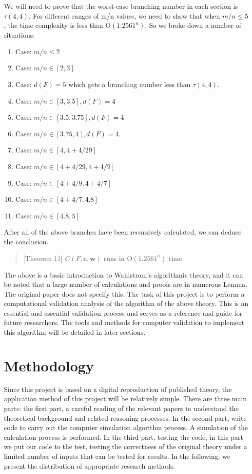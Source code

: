 \documentclass{sigchi}
\begin{document}
We will need to prove that the worst-case branching number in each section is $\tau(4,4)$. For different ranges of m/n values, we need to show that when $m/n\leqslant5$, the time complexity is less than $\mathrm{O}\left(1.2561^{n}\right)$. So we broke down a number of situations.
\begin{enumerate}
	\item Case: $m / n \leqslant2$
	\item Case: $m / n \in[2,3]$
	\item Case: $d(F)=5$ which gets a branching number less than $\tau(4,4)$.
	\item Case: $m / n \in[3,3.5], d(F)=4$
	\item Case: $m / n \in[3.5,3.75], d(F)=4$
	\item Case: $ m / n \in[3.75,4], d(F)=4 .$ 
	\item Case:  $m / n \in[4,4+4 / 29]$
	\item Case: $m / n \in[4+4 / 29,4+4 / 9]$
	\item Case: $m / n \in[4+4 / 9,4+4 / 7]$
	\item Case: $m / n \in[4+4 / 7,4.8]$
	\item Case: $m / n \in[4.8,5]$
\end{enumerate}
After all of the above branches have been recursively calculated, we can deduce the conclusion.
\begin{quote}[Theorem 11]
	$C(F, \mathbf{c}, \mathbf{w})$ runs in $\mathrm{O}\left(1.2561^{n}\right)$ time.
\end{quote}
The above is a basic introduction to Wahlstrom's algorithmic theory, and it can be noted that a large number of calculations and proofs are in numerous Lemma. The original paper does not specify this. The task of this project is to perform a computational validation analysis of the algorithm of the above theory. This is an essential and essential validation process and serves as a reference and guide for future researchers. The tools and methods for computer validation to implement this algorithm will be detailed in later sections.

\section{Methodology}
Since this project is based on a digital reproduction of published theory, the application method of this project will be relatively simple. There are three main parts: the first part, a careful reading of the relevant papers to understand the theoretical background and related reasoning processes. In the second part, write code to carry out the computer simulation algorithm process. A simulation of the calculation process is performed. In the third part, testing the code, in this part we put our code to the test, testing the correctness of the original theory under a limited number of inputs that can be tested for results. In the following, we present the distribution of appropriate research methods.
\end{document}
